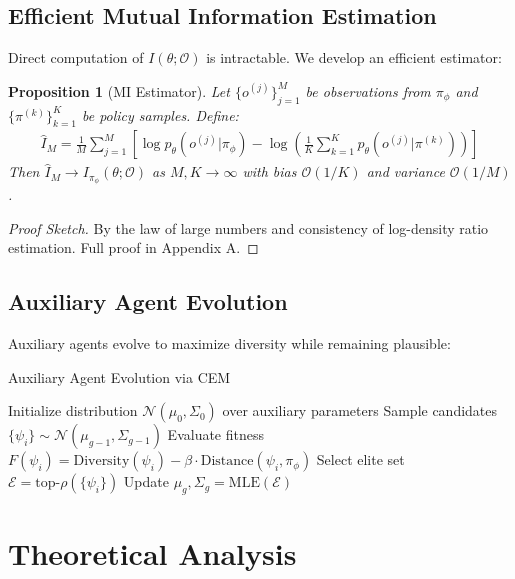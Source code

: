 \documentclass[12pt, a4paper]{article}
\newtheorem{proposition}{Proposition}
\begin{document}
\subsection{Efficient Mutual Information Estimation}

Direct computation of $I(\theta; \mathcal{O})$ is intractable. We develop an efficient estimator:

\begin{proposition}[MI Estimator]\label{prop:estimator}
Let $\{o^{(j)}\}_{j=1}^M$ be observations from $\pi_\phi$ and $\{\pi^{(k)}\}_{k=1}^K$ be policy samples. Define:
\begin{align}
\hat{I}_M = \frac{1}{M} \sum_{j=1}^M \left[\log p_\theta(o^{(j)} | \pi_\phi) - \log \left(\frac{1}{K} \sum_{k=1}^K p_\theta(o^{(j)} | \pi^{(k)})\right)\right]
\end{align}
Then $\hat{I}_M \rightarrow I_{\pi_\phi}(\theta; \mathcal{O})$ as $M, K \rightarrow \infty$ with bias $\mathcal{O}(1/K)$ and variance $\mathcal{O}(1/M)$.
\end{proposition}

\begin{proof}[Proof Sketch]
By the law of large numbers and consistency of log-density ratio estimation. Full proof in Appendix A.
\end{proof}

\subsection{Auxiliary Agent Evolution}

Auxiliary agents evolve to maximize diversity while remaining plausible:

\begin{algorithm}[H]
\caption{Auxiliary Agent Evolution via CEM}
\begin{algorithmic}[1]
\STATE Initialize distribution $\mathcal{N}(\mu_0, \Sigma_0)$ over auxiliary parameters
  \STATE Sample candidates $\{\psi_i\} \sim \mathcal{N}(\mu_{g-1}, \Sigma_{g-1})$
  \STATE Evaluate fitness $F(\psi_i) = \text{Diversity}(\psi_i) - \beta \cdot \text{Distance}(\psi_i, \pi_\phi)$
  \STATE Select elite set $\mathcal{E} = \text{top-}\rho(\{\psi_i\})$
  \STATE Update $\mu_g, \Sigma_g = \text{MLE}(\mathcal{E})$
\ENDFOR
\end{algorithmic}
\end{algorithm}

\section{Theoretical Analysis}
\end{document}
